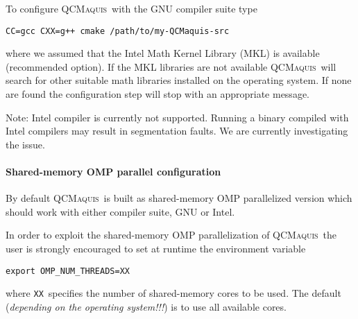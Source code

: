 \documentclass[bibliography=totoc,12pt,a4paper]{scrartcl}
\newcommand{\qcm}{\textsc{QCMaquis}}
\begin{document}
\noindent To configure \qcm\ with the GNU compiler suite type
\begin{verbatim}
CC=gcc CXX=g++ cmake /path/to/my-QCMaquis-src
\end{verbatim}

\noindent where we assumed that the Intel Math Kernel Library (MKL) is available (recommended option).
If the MKL libraries are not available \qcm\ will search for other suitable math libraries installed on the operating system. If none are found the configuration step will stop with an appropriate message.

%

\begin{framed}
 \noindent Note: Intel compiler is currently not supported. Running a binary compiled with Intel compilers may result in segmentation faults. We are currently investigating the issue.
\end{framed}

\paragraph{Shared-memory OMP parallel configuration}\label{sec:parallel-stand}$\;$\\

By default \qcm\ is built as shared-memory OMP parallelized version which should work with either compiler suite, GNU or Intel.

\vspace{2ex}

In order to exploit the shared-memory OMP parallelization of \qcm\ the user is strongly encouraged to set at runtime the environment
variable
\begin{verbatim}
export OMP_NUM_THREADS=XX
\end{verbatim}
where \texttt{XX}\ specifies the number of shared-memory cores to be used. The default (\emph{depending on the operating system!!!}) is to use all available cores.
\end{document}
